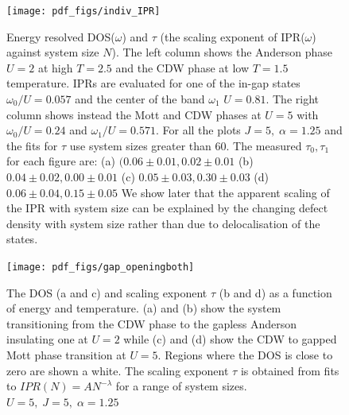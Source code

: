 \begin{figure}
\hypertarget{fig:indiv_IPR}{%
\centering
\texttt{[image: pdf\_figs/indiv\_IPR]}
\caption{Energy resolved DOS(\(\omega\)) and \(\tau\) (the scaling exponent of IPR(\(\omega\)) against system size \(N\)). The left column shows the Anderson phase \(U = 2\) at high \(T = 2.5\) and the CDW phase at low \(T = 1.5\) temperature. IPRs are evaluated for one of the in-gap states \(\omega_0/U = 0.057\) and the center of the band \(\omega_1\) \(U = 0.81\). The right column shows instead the Mott and CDW phases at \(U = 5\) with \(\omega_0/U = 0.24\) and \(\omega_1/U = 0.571\). For all the plots \(J = 5,\;\alpha = 1.25\) and the fits for \(\tau\) use system sizes greater than 60. The measured \(\tau_0,\tau_1\) for each figure are: (a) \((0.06\pm0.01, 0.02\pm0.01\) (b) \(0.04\pm0.02, 0.00\pm0.01\) (c) \(0.05\pm0.03, 0.30\pm0.03\) (d) \(0.06\pm0.04, 0.15\pm0.05\) We show later that the apparent scaling of the IPR with system size can be explained by the changing defect density with system size rather than due to delocalisation of the states.}\label{fig:indiv_IPR}
}
\end{figure}

\begin{figure}
\hypertarget{fig:band_opening}{%
\centering
\texttt{[image: pdf\_figs/gap\_openingboth]}
\caption{The DOS (a and c) and scaling exponent \(\tau\) (b and d) as a function of energy and temperature. (a) and (b) show the system transitioning from the CDW phase to the gapless Anderson insulating one at \(U=2\) while (c) and (d) show the CDW to gapped Mott phase transition at \(U=5\). Regions where the DOS is close to zero are shown a white. The scaling exponent \(\tau\) is obtained from fits to \(IPR(N) = A N^{-\lambda}\) for a range of system sizes. \(U = 5,\;J = 5,\;\alpha = 1.25\)}\label{fig:band_opening}
}
\end{figure}

